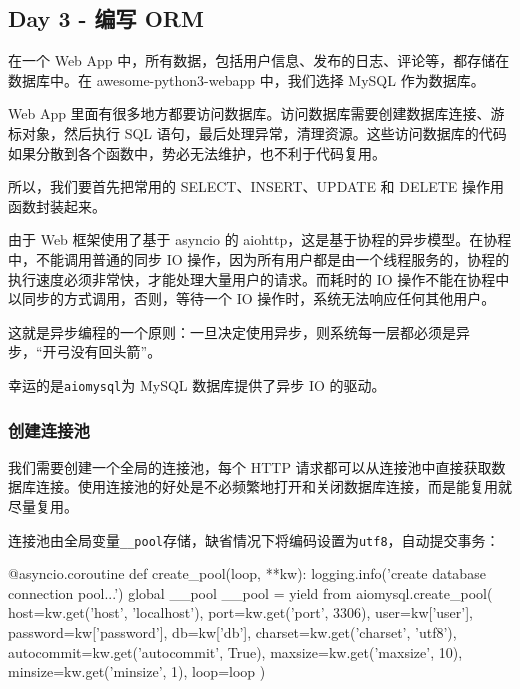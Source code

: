 \hypertarget{day-3---ux7f16ux5199-orm}{%
\subsection{Day 3 - 编写 ORM}\label{day-3---ux7f16ux5199-orm}}

在一个 Web App
中，所有数据，包括用户信息、发布的日志、评论等，都存储在数据库中。在
awesome-python3-webapp 中，我们选择 MySQL 作为数据库。

Web App
里面有很多地方都要访问数据库。访问数据库需要创建数据库连接、游标对象，然后执行
SQL
语句，最后处理异常，清理资源。这些访问数据库的代码如果分散到各个函数中，势必无法维护，也不利于代码复用。

所以，我们要首先把常用的 SELECT、INSERT、UPDATE 和 DELETE
操作用函数封装起来。

由于 Web 框架使用了基于 asyncio 的
aiohttp，这是基于协程的异步模型。在协程中，不能调用普通的同步 IO
操作，因为所有用户都是由一个线程服务的，协程的执行速度必须非常快，才能处理大量用户的请求。而耗时的
IO 操作不能在协程中以同步的方式调用，否则，等待一个 IO
操作时，系统无法响应任何其他用户。

这就是异步编程的一个原则：一旦决定使用异步，则系统每一层都必须是异步，``开弓没有回头箭''。

幸运的是\texttt{aiomysql}为 MySQL 数据库提供了异步 IO 的驱动。

\hypertarget{ux521bux5efaux8fdeux63a5ux6c60}{%
\subsubsection{创建连接池}\label{ux521bux5efaux8fdeux63a5ux6c60}}

我们需要创建一个全局的连接池，每个 HTTP
请求都可以从连接池中直接获取数据库连接。使用连接池的好处是不必频繁地打开和关闭数据库连接，而是能复用就尽量复用。

连接池由全局变量\texttt{\_\_pool}存储，缺省情况下将编码设置为\texttt{utf8}，自动提交事务：

\begin{pythoncode}
@asyncio.coroutine
def create_pool(loop, **kw):
    logging.info('create database connection pool...')
    global __pool
    __pool = yield from aiomysql.create_pool(
        host=kw.get('host', 'localhost'),
        port=kw.get('port', 3306),
        user=kw['user'],
        password=kw['password'],
        db=kw['db'],
        charset=kw.get('charset', 'utf8'),
        autocommit=kw.get('autocommit', True),
        maxsize=kw.get('maxsize', 10),
        minsize=kw.get('minsize', 1),
        loop=loop
    )
\end{pythoncode}

